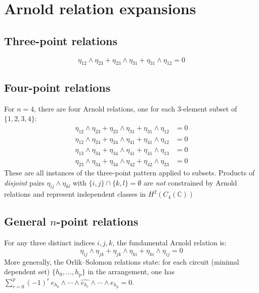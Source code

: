 \section{Arnold relation expansions}

\subsection{Three-point relations}

\[\eta_{12} \wedge \eta_{23} + \eta_{23} \wedge \eta_{31} + \eta_{31} \wedge \eta_{12} = 0\]

\subsection{Four-point relations}

For $n = 4$, there are four Arnold relations, one for each $3$-element subset of
$\{1,2,3,4\}$:
\begin{align}
\eta_{12} \wedge \eta_{23} + \eta_{23} \wedge \eta_{31} + \eta_{31} \wedge \eta_{12} &= 0 \\
\eta_{12} \wedge \eta_{24} + \eta_{24} \wedge \eta_{41} + \eta_{41} \wedge \eta_{12} &= 0 \\
\eta_{13} \wedge \eta_{34} + \eta_{34} \wedge \eta_{41} + \eta_{41} \wedge \eta_{13} &= 0 \\
\eta_{23} \wedge \eta_{34} + \eta_{34} \wedge \eta_{42} + \eta_{42} \wedge \eta_{23} &= 0
\end{align}
These are all instances of the three-point pattern applied to subsets.
Products of \emph{disjoint} pairs $\eta_{ij} \wedge \eta_{kl}$ with
$\{i,j\} \cap \{k,l\} = \emptyset$ are \emph{not} constrained by Arnold relations
and represent independent classes in $H^2(C_4(\mathbb{C}))$

\subsection{\texorpdfstring{General $n$-point relations}{General n-point relations}}

For any three distinct indices $i, j, k$, the fundamental Arnold relation is:
\[\eta_{ij} \wedge \eta_{jk} + \eta_{jk} \wedge \eta_{ki} + \eta_{ki} \wedge \eta_{ij} = 0\]
More generally, the Orlik--Solomon relations state: for each circuit (minimal dependent set) $\{h_0, \ldots, h_p\}$ in the arrangement, one has $\sum_{r=0}^{p} (-1)^r \, e_{h_0} \wedge \cdots \wedge \widehat{e_{h_r}} \wedge \cdots \wedge e_{h_p} = 0$.

